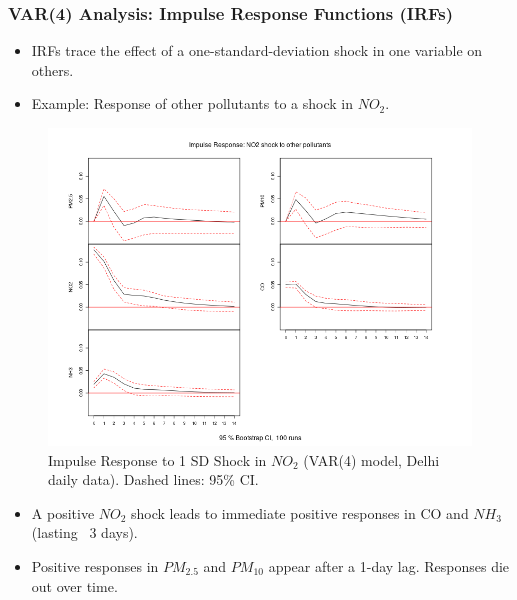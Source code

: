 \documentclass[svgnames, 12pt]{beamer}
\begin{document}
\begin{frame}
    \frametitle{VAR(4) Analysis: Impulse Response Functions (IRFs)}
    \begin{itemize}
        \item IRFs trace the effect of a one-standard-deviation shock in one variable on others.
        \item Example: Response of other pollutants to a shock in $NO_2$.
    \end{itemize}
    \begin{figure}
        \includegraphics[width=0.9\linewidth]{../analysis/assets/irf_no2_others.png}
        \caption{Impulse Response to 1 SD Shock in $NO_2$ (VAR(4) model, Delhi daily data). Dashed lines: 95\% CI.}
        \label{fig:irf_no2_others_pres}
    \end{figure}
    \begin{itemize}
        \item \footnotesize A positive $NO_2$ shock leads to immediate positive responses in CO and $NH_3$ (lasting ~3 days).
        \item \footnotesize Positive responses in $PM_{2.5}$ and $PM_{10}$ appear after a 1-day lag. Responses die out over time.
    \end{itemize}
\end{frame}
\end{document}
